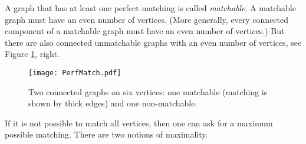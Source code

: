 

\setcounter{section}{4}
\setcounter{subsection}{1}
\setcounter{dfn}{1}


A graph that has at least one perfect matching is called \emph{matchable}.
A matchable graph must have an even number of vertices.
(More generally, every connected component of a matchable graph must have an even number of vertices.)
But there are also connected unmatchable graphs with an even number of vertices, see Figure \ref{fig:PerfMatch}, right.

\begin{figure}[ht]
\begin{center}
\texttt{[image: PerfMatch.pdf]}
\end{center}
\caption{Two connected graphs on six vertices: one matchable (matching is shown by thick edges) and one non-matchable.}
\label{fig:PerfMatch}
\end{figure}

If it is not possible to match all vertices, then one can ask for a maximum possible matching.
There are two notions of maximality.

